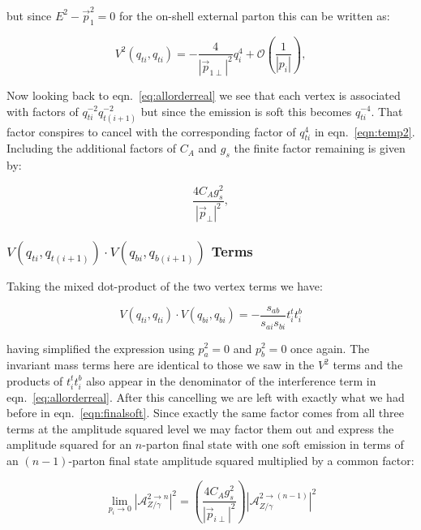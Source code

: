 			but since $E^2-\vec{p}_1^2=0$ for the on-shell external parton this can be written as:

			\begin{equation}
				V^2(q_{ti}, q_{ti}) = - \frac{4}{|\vec{p}_{1\perp}|^2}q^4_{i} + \mathcal{O}\left(\frac{1}{|p_i|}\right),
				\label{eqn:temp2}
			\end{equation}

			Now looking back to eqn.~\eqref{eq:allorderreal} we see that each vertex is associated with factors of
			$q^{-2}_{ti}q^{-2}_{t(i+1)}$ but since the emission is soft this becomes $q^{-4}_{ti}$.
			That factor conspires to cancel with the corresponding factor of $q^{4}_{ti}$ in eqn.~\eqref{eqn:temp2}.
			Including the additional factors of $C_A$ and $g_s$ the finite factor remaining is given by:

			\begin{equation}
				\frac{4C_Ag_s^2}{|\vec{p}_\perp|^2},
				\label{eqn:finalsoft}
			\end{equation}

		\subsubsection{$V(q_{ti}, q_{t(i+1)})\cdot V(q_{bi}, q_{b(i+1)})$ Terms}
			\label{sub:subsection_name}

			Taking the mixed dot-product of the two vertex terms we have:

			\begin{equation}
				V(q_{ti}, q_{ti})\cdot V(q_{bi}, q_{bi}) = -\frac{s_{ab}}{s_{ai}s_{bi}}t_i^tt_i^b
			\end{equation}

			having simplified the expression using $p_a^2=0$ and $p_b^2=0$ once again.  The invariant mass terms
			here are identical to those we saw in the $V^2$ terms and the products of $t_i^tt_i^b$ also appear
			in the denominator of the interference term in eqn.~\eqref{eq:allorderreal}.
			After this cancelling we are left with exactly what we had before in eqn.~\eqref{eqn:finalsoft}.
			Since exactly the same factor comes from all three terms at the amplitude squared level we may factor
			them out and express the amplitude squared for an $n$-parton final state with one soft emission in
			terms of an $(n-1)$-parton final state amplitude squared multiplied by a common factor:

			\begin{equation}
				\lim_{p_i\rightarrow0} |\mathcal{A}_{Z/\gamma}^{2\rightarrow n}|^2 = \left(\frac{4C_Ag_s^2}{|\vec{p}_{i\perp}|^2}\right)
					|\mathcal{A}_{Z/\gamma}^{2\rightarrow (n-1)}|^2
				\label{eqn:apparent}
			\end{equation}

